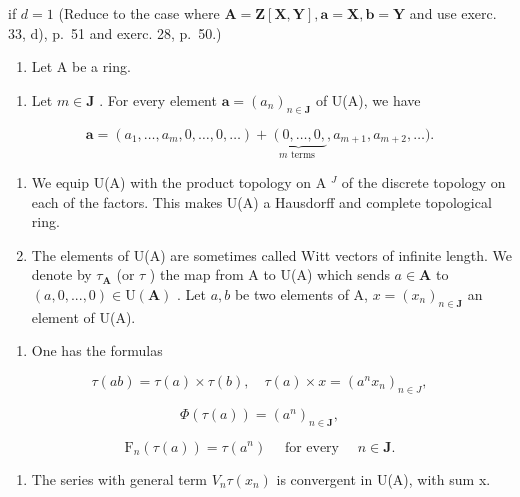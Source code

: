 if \(d=1\) (Reduce to the case where \(\mathbf{A}=\mathbf{Z}[\mathbf{X},\mathbf{Y}],\mathbf{a}=\mathbf{X},\mathbf{b}=\mathbf{Y}\) and use exerc. 33, d), p.~51 and exerc. 28, p.~50.)

\begin{enumerate}
\def\labelenumi{\arabic{enumi})}
\setcounter{enumi}{36}
\tightlist
\item
  Let A be a ring.
\end{enumerate}

\begin{enumerate}
\def\labelenumi{\alph{enumi})}
\tightlist
\item
  Let \(m \in \mathbf{J}\) . For every element \(\boldsymbol{a} = (a_n)_{n \in \mathbf{J}}\) of U(A), we have
\end{enumerate}

\[
\boldsymbol {a} = \left(a _ {1}, \dots , a _ {m}, 0, \dots , 0, \dots\right) + \underbrace {\left(0 , \dots , 0 , \right.} _ {m \text {   terms }}, a _ {m + 1}, a _ {m + 2}, \dots).
\]

\begin{enumerate}
\def\labelenumi{\alph{enumi})}
\setcounter{enumi}{1}
\item
  We equip U(A) with the product topology on A \(^{J}\) of the discrete topology on each of the factors. This makes U(A) a Hausdorff and complete topological ring.
\item
  The elements of U(A) are sometimes called Witt vectors of infinite length. We denote by \(\tau_{\mathbf{A}}\) (or \(\tau\) ) the map from A to U(A) which sends \(a \in \mathbf{A}\) to \((a, 0, ..., 0) \in \mathrm{U}(\mathbf{A})\) . Let \(a, b\) be two elements of A, \(x = (x_n)_{n \in \mathbf{J}}\) an element of U(A).
\end{enumerate}

\begin{enumerate}
\def\labelenumi{(\roman{enumi})}
\tightlist
\item
  One has the formulas
\end{enumerate}

\[
\tau (a b) = \tau (a) \times \tau (b), \quad \tau (a) \times x = \left(a ^ {n} x _ {n}\right) _ {n \in J},
\]

\[
\Phi (\tau (a)) = (a ^ {n}) _ {n \in \mathbf {J}},
\]

\[
\mathrm{F} _ {n} (\tau (a)) = \tau (a ^ {n}) \quad \text { for every } \quad n \in \mathbf {J}.
\]

\begin{enumerate}
\def\labelenumi{(\roman{enumi})}
\setcounter{enumi}{1}
\tightlist
\item
  The series with general term \(V_{n}\tau(x_{n})\) is convergent in U(A), with sum x.
\end{enumerate}

